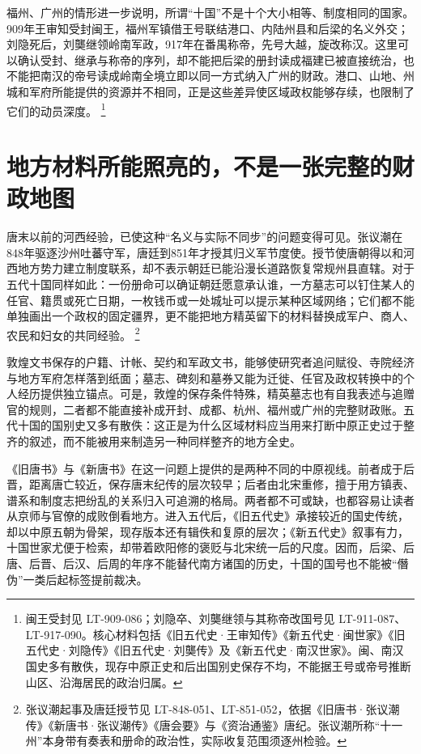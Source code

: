 福州、广州的情形进一步说明，所谓“十国”不是十个大小相等、制度相同的国家。909年王审知受封闽王，福州军镇借王号联结港口、内陆州县和后梁的名义外交；刘隐死后，刘龑继领岭南军政，917年在番禺称帝，先号大越，旋改称汉。这里可以确认受封、继承与称帝的序列，却不能把后梁的册封读成福建已被直接统治，也不能把南汉的帝号读成岭南全境立即以同一方式纳入广州的财政。港口、山地、州城和军府所能提供的资源并不相同，正是这些差异使区域政权能够存续，也限制了它们的动员深度。%
\footnote{闽王受封见 LT-909-086；刘隐卒、刘龑继领与其称帝改国号见 LT-911-087、LT-917-090。核心材料包括《旧五代史·王审知传》《新五代史·闽世家》《旧五代史·刘隐传》《旧五代史·刘龑传》及《新五代史·南汉世家》。闽、南汉国史多有散佚，现存中原正史和后出国别史保存不均，不能据王号或帝号推断山区、沿海居民的政治归属。}

\section{地方材料所能照亮的，不是一张完整的财政地图}

唐末以前的河西经验，已使这种“名义与实际不同步”的问题变得可见。张议潮在848年驱逐沙州吐蕃守军，唐廷到851年才授其归义军节度使。授节使唐朝得以和河西地方势力建立制度联系，却不表示朝廷已能沿漫长道路恢复常规州县直辖。对于五代十国同样如此：一份册命可以确证朝廷愿意承认谁，一方墓志可以钉住某人的任官、籍贯或死亡日期，一枚钱币或一处城址可以提示某种区域网络；它们都不能单独画出一个政权的固定疆界，更不能把地方精英留下的材料替换成军户、商人、农民和妇女的共同经验。%
\footnote{张议潮起事及唐廷授节见 LT-848-051、LT-851-052，依据《旧唐书·张议潮传》《新唐书·张议潮传》《唐会要》与《资治通鉴》唐纪。张议潮所称“十一州”本身带有奏表和册命的政治性，实际收复范围须逐州检验。}

敦煌文书保存的户籍、计帐、契约和军政文书，能够使研究者追问赋役、寺院经济与地方军府怎样落到纸面；墓志、碑刻和墓券又能为迁徙、任官及政权转换中的个人经历提供独立锚点。可是，敦煌的保存条件特殊，精英墓志也有自我表述与追赠官的规则，二者都不能直接补成开封、成都、杭州、福州或广州的完整财政账。五代十国的国别史又多有散佚：这正是为什么区域材料应当用来打断中原正史过于整齐的叙述，而不能被用来制造另一种同样整齐的地方全史。

《旧唐书》与《新唐书》在这一问题上提供的是两种不同的中原视线。前者成于后晋，距离唐亡较近，保存唐末纪传的层次较早；后者由北宋重修，擅于用方镇表、谱系和制度志把纷乱的关系归入可追溯的格局。两者都不可或缺，也都容易让读者从京师与官僚的成败倒看地方。进入五代后，《旧五代史》承接较近的国史传统，却以中原五朝为骨架，现存版本还有辑佚和复原的层次；《新五代史》叙事有力，十国世家尤便于检索，却带着欧阳修的褒贬与北宋统一后的尺度。因而，后梁、后唐、后晋、后汉、后周的年序不能替代南方诸国的历史，十国的国号也不能被“僭伪”一类后起标签提前裁决。

